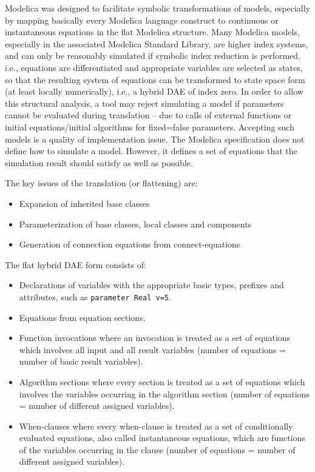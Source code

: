 Modelica was designed to facilitate symbolic transformations of models,
especially by mapping basically every Modelica language construct to
continuous or instantaneous equations in the flat Modelica structure.
Many Modelica models, especially in the associated Modelica Standard
Library, are higher index systems, and can only be reasonably simulated
if symbolic index reduction is performed, i.e., equations are
differentiated and appropriate variables are selected as states, so that
the resulting system of equations can be transformed to state space form
(at least locally numerically), i.e., a hybrid DAE of index zero. In
order to allow this structural analysis, a tool may reject simulating a
model if parameters cannot be evaluated during translation -- due to
calls of external functions or initial equations/initial algorithms for
fixed=false parameters. Accepting such models is a quality of
implementation issue. The Modelica specification does not define how to
simulate a model. However, it defines a set of equations that the
simulation result should satisfy as well as possible.

The key issues of the translation (or flattening) are:
\begin{itemize}
\item
  Expansion of inherited base classes
\item
  Parameterization of base classes, local classes and components
\item
  Generation of connection equations from connect-equations
\end{itemize}

The flat hybrid DAE form consists of:
\begin{itemize}
\item
  Declarations of variables with the appropriate basic types, prefixes
  and attributes, such as \lstinline!parameter Real v=5!.
\item
  Equations from equation sections.
\item
  Function invocations where an invocation is treated as a set of
  equations which involves all input and all result variables (number of
  equations = number of basic result variables).
\item
  Algorithm sections where every section is treated as a set of
  equations which involves the variables occurring in the algorithm
  section (number of equations = number of different assigned
  variables).
\item
  When-clauses where every when-clause is treated as a set of
  conditionally evaluated equations, also called instantaneous
  equations, which are functions of the variables occurring in the
  clause (number of equations = number of different assigned variables).
\end{itemize}

